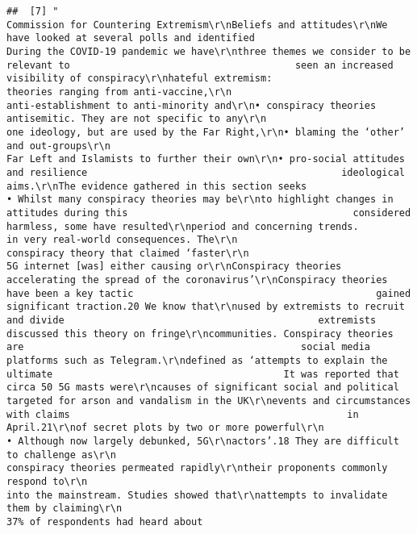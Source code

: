 \documentclass[
]{book}
\begin{document}
\begin{verbatim}
##  [7] "                                                    Commission for Countering Extremism\r\nBeliefs and attitudes\r\nWe have looked at several polls and identified                                   During the COVID-19 pandemic we have\r\nthree themes we consider to be relevant to                                       seen an increased visibility of conspiracy\r\nhateful extremism:                                                               theories ranging from anti-vaccine,\r\n                                                                                 anti-establishment to anti-minority and\r\n• conspiracy theories                                                            antisemitic. They are not specific to any\r\n                                                                                 one ideology, but are used by the Far Right,\r\n• blaming the ‘other’ and out-groups\r\n                                                                                 Far Left and Islamists to further their own\r\n• pro-social attitudes and resilience                                            ideological aims.\r\nThe evidence gathered in this section seeks                                      • Whilst many conspiracy theories may be\r\nto highlight changes in attitudes during this                                       considered harmless, some have resulted\r\nperiod and concerning trends.                                                       in very real-world consequences. The\r\n                                                                                    conspiracy theory that claimed ‘faster\r\n                                                                                    5G internet [was] either causing or\r\nConspiracy theories                                                                 accelerating the spread of the coronavirus’\r\nConspiracy theories have been a key tactic                                          gained significant traction.20 We know that\r\nused by extremists to recruit and divide                                            extremists discussed this theory on fringe\r\ncommunities. Conspiracy theories are                                                social media platforms such as Telegram.\r\ndefined as ‘attempts to explain the ultimate                                        It was reported that circa 50 5G masts were\r\ncauses of significant social and political                                          targeted for arson and vandalism in the UK\r\nevents and circumstances with claims                                                in April.21\r\nof secret plots by two or more powerful\r\n                                                                                 • Although now largely debunked, 5G\r\nactors’.18 They are difficult to challenge as\r\n                                                                                    conspiracy theories permeated rapidly\r\ntheir proponents commonly respond to\r\n                                                                                    into the mainstream. Studies showed that\r\nattempts to invalidate them by claiming\r\n                                                                                    37% of respondents had heard about 
\end{verbatim}
\end{document}
